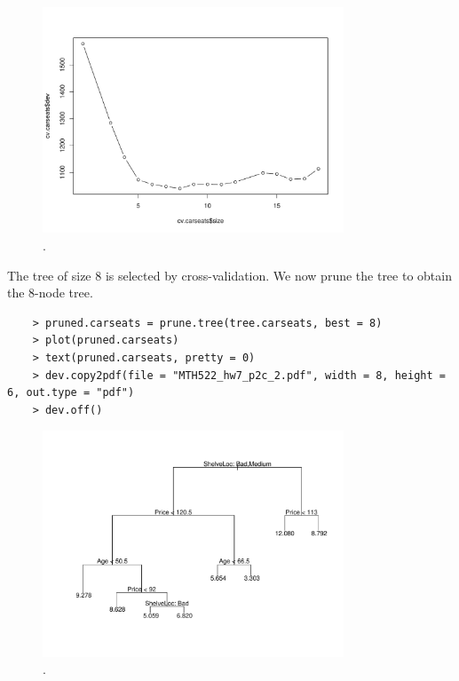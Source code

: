 \documentclass{article}
\begin{document}
\begin{figure}[htb]
	\begin{center}
		\includegraphics[width=0.8\textwidth]{MTH522_hw7_p2c.pdf}
	\end{center}
	\caption{.}
	\label{fig:MTH522_hw7_p2c}
\end{figure}

The tree of size 8 is selected by cross-validation. We now prune the tree to obtain the 8-node tree.\\

\newpage

\begin{program}
	\begin{verbatim}
	> pruned.carseats = prune.tree(tree.carseats, best = 8)
	> plot(pruned.carseats)
	> text(pruned.carseats, pretty = 0)
	> dev.copy2pdf(file = "MTH522_hw7_p2c_2.pdf", width = 8, height = 6, out.type = "pdf")
	> dev.off()
	\end{verbatim}
\end{program}

\begin{figure}[htb]
	\begin{center}
		\includegraphics[width=0.8\textwidth]{MTH522_hw7_p2c_2.pdf}
	\end{center}
	\caption{.}
	\label{fig:MTH522_hw7_p2c_2}
\end{figure}
\end{document}
